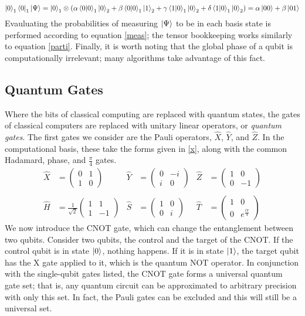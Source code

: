 \documentclass{article}
\begin{document}
\begin{paragraph}{}
\begin{equation}\label{parti}
\ket{0}_1\bra{0}_1\ket{\Psi}=\ket{0}_1\otimes(\alpha\braket{0|0}_1\ket{0}_2+\beta\braket{0|0}_1\ket{1}_2+\gamma\braket{1|0}_1\ket{0}_2+\delta\braket{1|0}_1\ket{0}_2)=\alpha\ket{00}+\beta\ket{01}
\end{equation}
Evauluating the probabilities of measuring $\ket{\Psi}$ to be in each basis state is performed according to equation \ref{meas}; the tensor bookkeeping works similarly to equation \ref{parti}. Finally, it is worth noting that the global phase of a qubit is computationally irrelevant; many algorithms take advantage of this fact. \cite{nielsen}
\end{paragraph}
\subsection{Quantum Gates}
\begin{paragraph}{}
Where the bits of classical computing are replaced with quantum states, the gates of classical computers are replaced with unitary linear operators, or \textit{quantum gates}. \cite{nielsen}  The first gates we consider are the Pauli operators, $\hat{X}$, $\hat{Y}$, and $\hat{Z}$. In the computational basis, these take the forms given in \ref{x}, along with the common Hadamard, phase, and $\frac{\pi}{4}$ gates. \cite{nielsen} 
\begin{align}\label{x}
\hat{X}&=\begin{pmatrix}0&1\\1&0\end{pmatrix}&\hat{Y}&=\begin{pmatrix}0&-i\\i&0\end{pmatrix}&\hat{Z}&=\begin{pmatrix}1&0\\0&-1\end{pmatrix}\\
\nonumber\\\hat{H}&=\frac{1}{\sqrt{2}}\begin{pmatrix}1&1\\1&-1\end{pmatrix}&\hat{S}&=\begin{pmatrix}1&0\\0&i\end{pmatrix}&\hat{T}&=\begin{pmatrix}1&0\\0&e^{\frac{i\pi}{4}}\end{pmatrix}\nonumber
\end{align}
We now introduce the CNOT gate, which can change the entanglement between two qubits. \cite{nielsen}  Consider two qubits, the control and the target of the CNOT.  If the control qubit is in state $\ket{0}$, nothing happens.  If it is in state $\ket{1}$, the target qubit has the X gate applied to it, which is the quantum NOT operator.  In conjunction with the single-qubit gates listed, the CNOT gate forms a universal quantum gate set; that is, any quantum circuit can be approximated to arbitrary precision with only this set.  In fact, the Pauli gates can be excluded and this will still be a universal set. \cite{nielsen}\end{paragraph}
\end{document}
